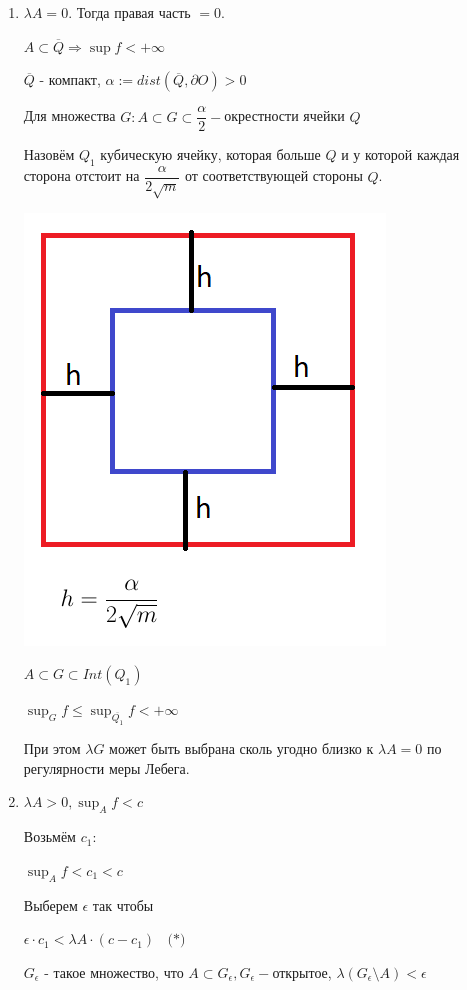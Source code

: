 \documentclass[paper=a4, fontsize=17pt]{article}
\begin{document}
\begin{enumerate}
	\item $\lambda A = 0$. Тогда правая часть $ = 0$.

	$A \subset \overline{Q} \Rightarrow \sup f < + \infty$

	$\overline{Q}$ - компакт, $\alpha := dist(\overline{Q}, \partial O) > 0$

	Для множества $G: A \subset G \subset \dfrac{\alpha}{2}-$окрестности ячейки $Q$

	Назовём $Q_1$ кубическую ячейку, которая больше $Q$ и у которой каждая сторона отстоит на $\dfrac{\alpha}{2 \sqrt{m}}$ от соответствующей стороны $Q$.

	\includegraphics[scale=1]{Th21Pic1.png}

	$A \subset G \subset Int(Q_1)$

	$\sup_G f \leqslant \sup_{\overline{Q_1}} f < + \infty$

	При этом $\lambda G$ может быть выбрана сколь угодно близко к $\lambda A = 0$ по регулярности меры Лебега.

	\item $\lambda A > 0, \sup_A f < c$

	Возьмём $c_1$:

	$\sup_A f < c_1 < c$

	Выберем $\epsilon$ так чтобы

	$\epsilon \cdot c_1 < \lambda A \cdot (c - c_1) ~~~~ \textbf{(*)}$

	$G_{\epsilon}$ - такое множество, что $A \subset G_{\epsilon}, G_{\epsilon}-$открытое, $\lambda(G_{\epsilon} \setminus A) < \epsilon$


\end{enumerate}
\end{document}
